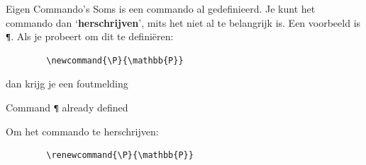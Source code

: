 \begin{frame}[fragile]{Eigen Commando's}
    Soms is een commando al gedefinieerd. 
    Je kunt het commando dan `\textbf{herschrijven}', mits het niet al te belangrijk is. 
    Een voorbeeld is \texttt{\P}. Als je probeert om dit te definiëren:
    \begin{verbatim}
        \newcommand{\P}{\mathbb{P}}
    \end{verbatim}
    dan krijg je een foutmelding
    \begin{tcolorbox}[boxrule = 0.5pt, colback=red!25!white]
        Command \texttt{\P} already defined
    \end{tcolorbox}
    \pause
    Om het commando te herschrijven:
    \begin{verbatim}
        \renewcommand{\P}{\mathbb{P}}
    \end{verbatim}
\end{frame}